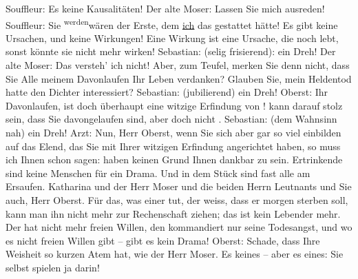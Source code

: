 \begin{ledgroupsized}[t]{13cm}
           \pstart
           Souffleur: Es  keine Kausalitäten!\pend
           \pstart
           Der alte Moser: Lassen Sie mich ausreden!\pend
           \pstart
           Souffleur: Sie \substVorne{}\textsuperscript{werden}{\allowbreak}\substDazwischen{}wären\substHinten{} der Erste, dem \uline{ich} das gestattet hätte! Es
               gibt keine Ursachen, und keine Wirkungen! Eine Wirkung ist eine Ursache, die noch
               lebt, sonst könnte sie nicht mehr wirken!\pend
           \pstart
           Sebastian: (selig frisierend):  ein Dreh!\pend
           \pstart
           Der alte Moser: Das versteh’ ich nicht! Aber, zum Teufel, merken Sie denn nicht, dass
               Sie Alle meinem Davonlaufen Ihr Leben verdanken? Glauben Sie, mein Heldentod hatte
               den Dichter interessiert?\pend
           \pstart
           Sebastian: (jubilierend)  ein Dreh!\pend
           \pstart
           Oberst: Ihr Davonlaufen, ist doch überhaupt eine witzige Erfindung von !  kann darauf stolz sein,
               dass Sie davongelaufen sind, aber doch nicht .\pend
           \pstart
           Sebastian: (dem Wahnsinn nah)  ein Dreh!\pend
           \pstart
           Arzt: Nun, Herr Oberst, wenn Sie sich aber gar so viel einbilden auf das Elend, das
               Sie mit Ihrer witzigen Erfindung angerichtet haben, so muss ich Ihnen schon sagen:
                   haben keinen Grund Ihnen dankbar zu sein.
               Ertrinkende sind keine Menschen für ein Drama. Und in dem Stück sind fast alle am
               Ersaufen. Katharina und der Herr Moser und die beiden Herrn Leutnants und Sie auch,
               Herr Oberst. Für das, was einer tut, der weiss, dass er morgen {\pb}sterben soll, kann man ihn nicht
               mehr zur Rechenschaft ziehen; das ist kein Lebender mehr. Der hat nicht mehr freien
               Willen, den kommandiert nur seine Todesangst, und wo es nicht freien Willen gibt –
               gibt es kein Drama!\pend
           \pstart
           Oberst: Schade, dass Ihre Weisheit so kurzen Atem hat, wie der Herr Moser. Es \label{T_L01900-3v}\label{T_L01900-3h} keines – aber es \label{T_L01900-2v}\label{T_L01900-2h} eines: Sie selbst spielen ja darin!\pend
           \pstart

\end{ledgroupsized}
